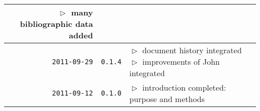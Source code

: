 \begin{table}
\begin{center}
\begin{tabular}{|r|c|p{9.4cm}|}
    $\vartriangleright$ many bibliographic data added\\
\hline
    \texttt{2011-09-29}
  & \texttt{0.1.4} 
  & $\vartriangleright$ document history integrated\newline
    $\vartriangleright$ improvements of John integrated\\
\hline
    \texttt{2011-09-12}
  & \texttt{0.1.0} 
  & $\vartriangleright$ introduction completed: purpose and methods \\
\hline
\hline 
\end{tabular}
\end{center}
\end{table}



%
